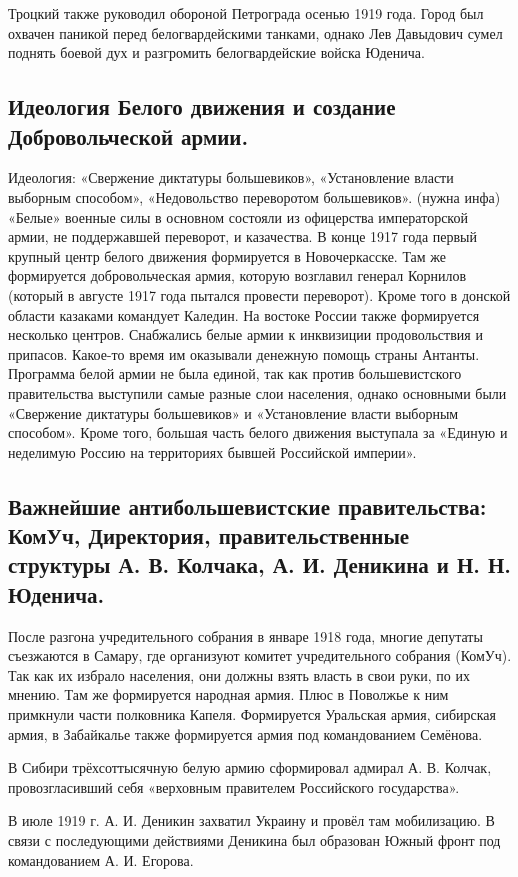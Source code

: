 Троцкий также руководил обороной Петрограда осенью 1919 года. Город был охвачен паникой перед белогвардейскими танками, однако Лев Давыдович сумел поднять боевой дух и разгромить белогвардейские войска Юденича.

\subsection{Идеология Белого движения и создание Добровольческой армии.}

Идеология: «Свержение диктатуры большевиков», «Установление власти выборным способом», «Недовольство переворотом большевиков». (нужна инфа)
«Белые» военные силы в основном состояли из офицерства императорской армии, не поддержавшей переворот, и казачества. В конце 1917 года первый крупный центр белого движения формируется в Новочеркасске. Там же формируется добровольческая армия, которую возглавил генерал Корнилов (который в августе 1917 года пытался провести переворот). Кроме того в донской области казаками командует Каледин. На востоке России также формируется несколько центров.
Снабжались белые армии к инквизиции продовольствия и припасов. Какое-то время им оказывали денежную помощь страны Антанты.
Программа белой армии не была единой, так как против большевистского правительства выступили самые разные слои населения, однако основными были «Свержение диктатуры большевиков» и «Установление власти выборным способом». Кроме того, большая часть белого движения выступала за «Единую и неделимую Россию на территориях бывшей Российской	 империи».

\subsection{Важнейшие антибольшевистские правительства: КомУч, Директория, правительственные структуры А. В. Колчака, А. И. Деникина и Н. Н. Юденича.}
После разгона учредительного собрания в январе 1918 года, многие депутаты съезжаются в Самару, где организуют комитет учредительного собрания (КомУч). Так как их избрало населения, они должны взять власть в свои руки, по их мнению. Там же формируется народная армия. Плюс в Поволжье к ним примкнули части полковника Капеля. Формируется Уральская армия, сибирская армия, в Забайкалье также формируется армия под командованием Семёнова. 

В Сибири трёхсоттысячную белую армию сформировал адмирал А. В. Колчак, провозгласивший себя «верховным правителем Российского государства».

В июле 1919 г. А. И. Деникин захватил Украину и провёл там мобилизацию. В связи с последующими действиями Деникина был образован Южный фронт под командованием А. И. Егорова.

